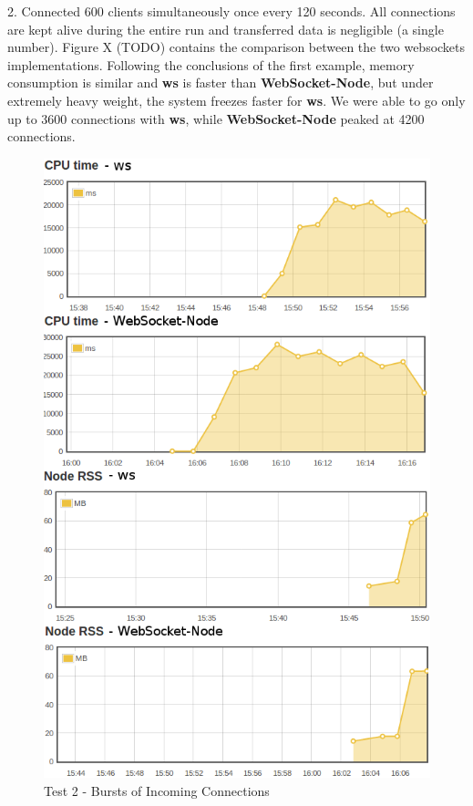 \documentclass[conference]{IEEEtran}
\begin{document}
2. Connected 600 clients simultaneously once every 120 seconds. All connections are
kept alive during the entire run and transferred data is negligible (a single number).
Figure X (TODO) contains the comparison between the two websockets implementations.
Following the conclusions of the first example, memory consumption is similar and
\textbf{ws} is faster than \textbf{WebSocket-Node}, but under extremely heavy weight,
the system freezes faster for \textbf{ws}. We were able to go only up to 3600 connections
with \textbf{ws}, while \textbf{WebSocket-Node} peaked at 4200 connections.
\\
\clearpage
\begin{frame}{}
  \begin{figure}
    \centering
	\includegraphics[width=1\linewidth]{img/test2v2.png}
    \caption{Test 2 - Bursts of Incoming Connections}
  \end{figure}
\end{frame}
\end{document}
